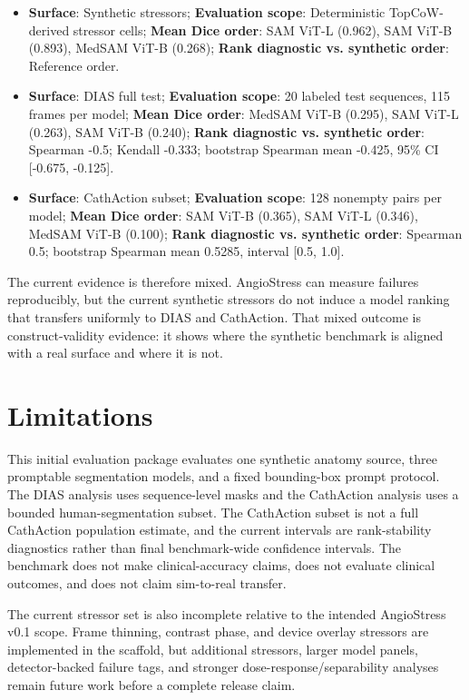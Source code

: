 \documentclass[11pt]{article}
\begin{document}
\begin{small}
\begin{itemize}
\item \textbf{Surface}: Synthetic stressors; \textbf{Evaluation scope}: Deterministic TopCoW-derived stressor cells; \textbf{Mean Dice order}: SAM ViT-L (0.962), SAM ViT-B (0.893), MedSAM ViT-B (0.268); \textbf{Rank diagnostic vs. synthetic order}: Reference order.
\item \textbf{Surface}: DIAS full test; \textbf{Evaluation scope}: 20 labeled test sequences, 115 frames per model; \textbf{Mean Dice order}: MedSAM ViT-B (0.295), SAM ViT-L (0.263), SAM ViT-B (0.240); \textbf{Rank diagnostic vs. synthetic order}: Spearman -0.5; Kendall -0.333; bootstrap Spearman mean -0.425, 95\% CI [-0.675, -0.125].
\item \textbf{Surface}: CathAction subset; \textbf{Evaluation scope}: 128 nonempty pairs per model; \textbf{Mean Dice order}: SAM ViT-B (0.365), SAM ViT-L (0.346), MedSAM ViT-B (0.100); \textbf{Rank diagnostic vs. synthetic order}: Spearman 0.5; bootstrap Spearman mean 0.5285, interval [0.5, 1.0].
\end{itemize}
\end{small}


The current evidence is therefore mixed. AngioStress can measure failures reproducibly, but the current synthetic stressors do not induce a model ranking that transfers uniformly to DIAS and CathAction. That mixed outcome is construct-validity evidence: it shows where the synthetic benchmark is aligned with a real surface and where it is not.


\section*{Limitations}

This initial evaluation package evaluates one synthetic anatomy source, three promptable segmentation models, and a fixed bounding-box prompt protocol. The DIAS analysis uses sequence-level masks and the CathAction analysis uses a bounded human-segmentation subset. The CathAction subset is not a full CathAction population estimate, and the current intervals are rank-stability diagnostics rather than final benchmark-wide confidence intervals. The benchmark does not make clinical-accuracy claims, does not evaluate clinical outcomes, and does not claim sim-to-real transfer.


The current stressor set is also incomplete relative to the intended AngioStress v0.1 scope. Frame thinning, contrast phase, and device overlay stressors are implemented in the scaffold, but additional stressors, larger model panels, detector-backed failure tags, and stronger dose-response/separability analyses remain future work before a complete release claim.
\end{document}
